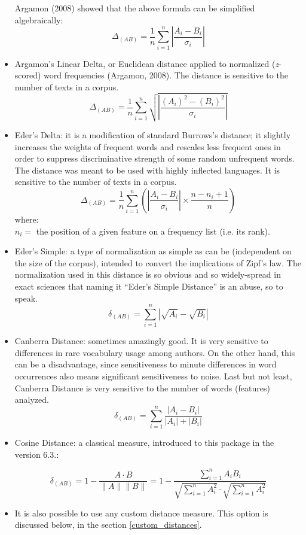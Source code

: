 \documentclass[11pt,a4paper]{article}
\def\margin#1{\marginpar{\textcolor{blue}{\footnotesize\tt #1}}}
\begin{document}
\begin{itemize}
\noindent Argamon (2008) showed that the above formula can be simplified
algebraically: 
\[
\Delta_{(AB)}=\frac{1}{n}\sum_{i=1}^{n}\left\vert \frac{A_{i}-B_{i}}{\sigma_{i}}\right\vert 
\]


\item Argamon's Linear Delta, or Euclidean distance applied to normalized
(\textit{z}-scored) word frequencies (Argamon, 2008).\margin{"dist.argamon"}
The distance is sensitive to the number of texts in a corpus. 
\[
\Delta_{(AB)}=\frac{1}{n}\sum_{i=1}^{n}\sqrt{\left\vert \frac{(A_{i})^{2}-(B_{i})^{2}}{\sigma_{i}}\right\vert }
\]

\item Eder's Delta: it is a modification of standard Burrows's distance;\margin{"dist.eder"}
it slightly increases the weights of frequent words and rescales less
frequent ones in order to suppress discriminative strength of some
random unfrequent words. The distance was meant to be used with highly
inflected languages. It is sensitive to the number of texts in a corpus.
\[
\Delta_{(AB)}=\frac{1}{n}\sum_{i=1}^{n}\left(\left\vert \frac{A_{i}-B_{i}}{\sigma_{i}}\right\vert \times\frac{n-n_{i}+1}{n}\right)
\]
where: \\
 $n_{i}=$ the position of a given feature on a frequency list (i.e. its rank).

\item Eder's Simple: a type of normalization as simple as can be (independent
on the size of the corpus), intended to convert the implications of
Zipf's law.\margin{"dist.simple"} The normalization
used in this distance is so obvious and so widely-spread in exact
sciences that naming it ``Eder's Simple Distance'' is an abuse, so to
speak. 
\[
\delta_{(AB)}=\sum_{i=1}^{n}\left\vert \sqrt{A_{i}}-\sqrt{B_{i}}\right\vert 
\]

\item Canberra Distance: sometimes amazingly good.\margin{"dist.canberra"}
It is very sensitive to differences in rare vocabulary usage among
authors. On the other hand, this can be a disadvantage, since sensitiveness
to minute differences in word occurrences also means significant sensitiveness
to noise. Last but not least, Canberra Distance is very sensitive
to the number of words (features) analyzed. 
\[
\delta_{(AB)}=\sum_{i=1}^{n}\frac{\left\vert A_{i}-B_{i}\right\vert }{\left\vert A_{i}\right\vert +\left\vert B_{i}\right\vert }
\]

\item Cosine Distance: a classical measure, introduced to this package 
in the version 6.3.\margin{"dist.cosine"}:

\[
\delta_{(AB)}=1- \frac{A\cdot B}{\|A\|\|B\|}= 1- \frac{\sum\limits _{i=1}^{n}{A_{i}B_{i}}}{\sqrt{\sum\limits _{i=1}^{n}{A_{i}^2}}\cdot\sqrt{\sum\limits _{i=1}^{n}{A_{i}^2}}}
\]




\item It is also possible to use any custom distance measure. This option is 
discussed below, in the section \ref{custom_distances}.

\end{itemize}
\end{document}

